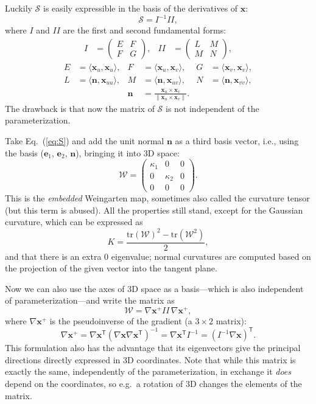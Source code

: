 \documentclass[a4paper]{article}
\begin{document}
Luckily $\mathcal{S}$ is easily expressible in the basis of the derivatives of
$\mathbf{x}$:
\[\mathcal{S}=I^{-1}I\!I,\]
where $I$ and $I\!I$ are the first and second fundamental forms:
\begin{align*}
  I &= \begin{pmatrix}E&F\\F&G\end{pmatrix}, &
  I\!I &= \begin{pmatrix}L&M\\M&N\end{pmatrix},
\end{align*}
\begin{align*}
  E &= \langle\mathbf{x}_u,\mathbf{x}_u\rangle, &
  F &= \langle\mathbf{x}_u,\mathbf{x}_v\rangle, &
  G &= \langle\mathbf{x}_v,\mathbf{x}_v\rangle,\\
  L &= \langle\mathbf{n},\mathbf{x}_{uu}\rangle, &
  M &= \langle\mathbf{n},\mathbf{x}_{uv}\rangle, &
  N &= \langle\mathbf{n},\mathbf{x}_{vv}\rangle,\\
  && \mathbf{n} &= \frac{\mathbf{x}_u\times\mathbf{x}_v}{\|{\mathbf{x}_u\times\mathbf{x}_v}\|}. &&
\end{align*}
The drawback is that now the matrix of $\mathcal{S}$ is not independent of the parameterization.

Take Eq.~(\ref{eq:S}) and add the unit normal $\mathbf{n}$ as a
third basis vector, i.e., using the basis ($\mathbf{e}_1$,
$\mathbf{e}_2$, $\mathbf{n}$), bringing it into 3D space:
\[
  \mathcal{W}=
  \begin{pmatrix}
    \kappa_1 & 0 & 0\\
    0 & \kappa_2 & 0\\
    0 & 0 & 0
  \end{pmatrix}.
\]
This is the \emph{embedded} Weingarten map, sometimes also called the
curvature tensor (but this term is abused). All the properties still
stand, except for the Gaussian curvature, which can be expressed as
\[K = \frac{\mathrm{tr}(\mathcal{W})^2-\mathrm{tr}(\mathcal{W}^2)}{2},\]
and that there is an extra $0$ eigenvalue; normal curvatures are
computed based on the projection of the given vector into the tangent plane.

Now we can also use the axes of 3D space as a basis---which is also
independent of parameterization---and write the matrix as
\[\mathcal{W}=\nabla\mathbf{x}^+I\!I\,\nabla\mathbf{x}^+,\]
where $\nabla\mathbf{x}^+$ is the pseudoinverse of the gradient (a $3\times2$ matrix):
\[\nabla\mathbf{x}^+=
\nabla\mathbf{x}^\textsf{T}(\nabla\mathbf{x}\nabla\mathbf{x}^\textsf{T})^{-1}=
\nabla\mathbf{x}^\textsf{T}I^{-1}=
(I^{-1}\nabla\mathbf{x})^\textsf{T}.\]
This formulation also has the advantage that its eigenvectors give the
principal directions directly expressed in 3D coordinates. Note that
while this matrix is exactly the same, independently of the
parameterization, in exchange it \emph{does} depend on the
coordinates, so e.g.~a rotation of 3D changes the elements of the
matrix.
\end{document}
